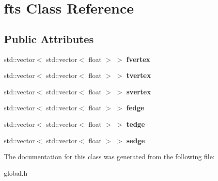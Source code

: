 \hypertarget{classfts}{}\section{fts Class Reference}
\label{classfts}
\subsection*{Public Attributes}
\begin{DoxyCompactItemize}
\item 
\mbox{\label{classfts_a7295fb27e8b87209e4be4bc116a99013}} 
std\+::vector$<$ std\+::vector$<$ float $>$ $>$ {\bfseries fvertex}
\item 
\mbox{\label{classfts_a4cf1248686c273f9c517d210015fa0c1}} 
std\+::vector$<$ std\+::vector$<$ float $>$ $>$ {\bfseries tvertex}
\item 
\mbox{\label{classfts_a28ca005657153a7052d512b558ebd9ac}} 
std\+::vector$<$ std\+::vector$<$ float $>$ $>$ {\bfseries svertex}
\item 
\mbox{\label{classfts_a7aec6b15df57f1dc4b62ca1a7ff23956}} 
std\+::vector$<$ std\+::vector$<$ float $>$ $>$ {\bfseries fedge}
\item 
\mbox{\label{classfts_aad0108365ca7bf36d771c416c15ec50a}} 
std\+::vector$<$ std\+::vector$<$ float $>$ $>$ {\bfseries tedge}
\item 
\mbox{\label{classfts_ab93187bdd5b15efb308195c460c57070}} 
std\+::vector$<$ std\+::vector$<$ float $>$ $>$ {\bfseries sedge}
\end{DoxyCompactItemize}


The documentation for this class was generated from the following file\+:\begin{DoxyCompactItemize}
\item 
global.\+h\end{DoxyCompactItemize}
